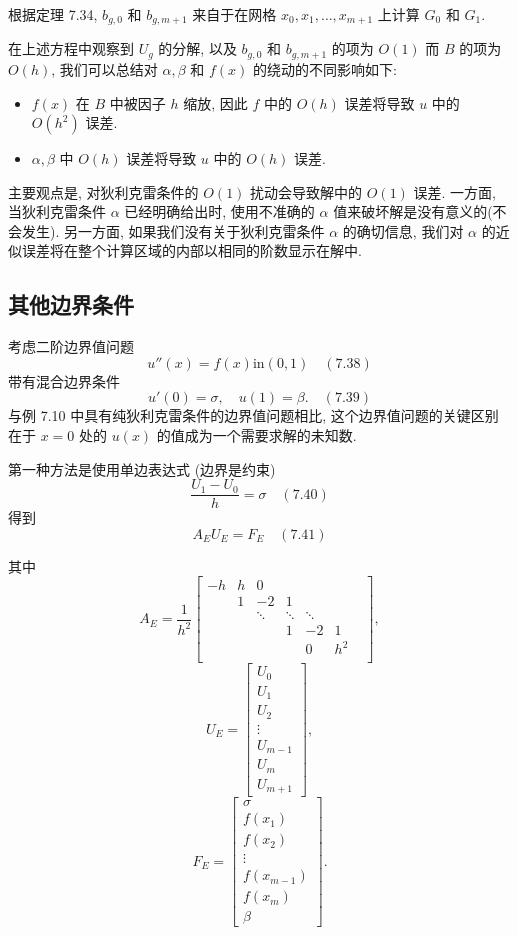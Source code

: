 \documentclass[a4paper]{ctexart}
\newcommand{\hl}[1]
{\noindent {\bf {#1}}}
\begin{document}
根据定理 7.34, $b_{g, 0}$ 和 $b_{g, m + 1}$ 
来自于在网格 $x_0, x_1, \ldots, x_{m + 1} $ 上计算 $G_0$ 和 $G_1$.

在上述方程中观察到 $U_g$ 的分解, 以及 $b_{g,0}$ 和 $b_{g,m + 1}$ 的项为 
$O(1)$ 而 $B$ 的项为 $O(h)$, 我们可以总结对 $\alpha, \beta$ 和 $f(x)$ 
的绕动的不同影响如下:
\begin{itemize}
  \item $f(x)$ 在 $B$ 中被因子 $h$ 缩放, 
  因此 $f$ 中的 $O(h)$ 误差将导致 $u$ 中的 $O(h^2)$ 误差.
  \item $\alpha, \beta$ 中 $O(h)$ 误差将导致 $u$ 中的 $O(h)$ 误差.
\end{itemize}
主要观点是, 对狄利克雷条件的 $O(1)$ 扰动会导致解中的 $O(1)$ 误差.
一方面, 当狄利克雷条件 $\alpha$ 已经明确给出时, 
使用不准确的 $\alpha$ 值来破坏解是没有意义的(不会发生). 
另一方面, 如果我们没有关于狄利克雷条件 $\alpha$ 的确切信息, 
我们对 $\alpha$ 的近似误差将在整个计算区域的内部以相同的阶数显示在解中.


\subsection{其他边界条件}

\hl{例 7.35} 考虑二阶边界值问题
$$
u''(x) = f(x) \text{in} (0, 1) \quad (7.38)
$$
带有混合边界条件
$$
u'(0) = \sigma, \quad u(1) = \beta. \quad (7.39)
$$
与例 7.10 中具有纯狄利克雷条件的边界值问题相比, 
这个边界值问题的关键区别在于 $x = 0$ 处的 $u(x)$ 的值成为一个需要求解的未知数.

第一种方法是使用单边表达式 (边界是约束)
$$
\frac{U_1 - U_0}{h} = \sigma \quad (7.40)
$$
得到
$$
A_EU_E = F_E \quad (7.41)
$$

其中
$$
A_E = \frac{1}{h^2} \begin{bmatrix}
-h & h & 0 &  & & \\
&1 & -2 & 1 &  & & \\
& & \ddots & \ddots & \ddots & \\
& &  & 1 & -2 & 1 \\
&  &  &  & 0 & h^2 \\
\end{bmatrix},
$$
$$
U_E = \begin{bmatrix}
U_0 \\
U_1 \\
U_2 \\
\vdots \\
U_{m-1} \\
U_m \\
U_{m+1}
\end{bmatrix},
$$
$$
F_E = \begin{bmatrix}
\sigma \\
f(x_1) \\
f(x_2) \\
\vdots \\
f(x_{m-1}) \\
f(x_m) \\
\beta
\end{bmatrix}.
$$
\end{document}
